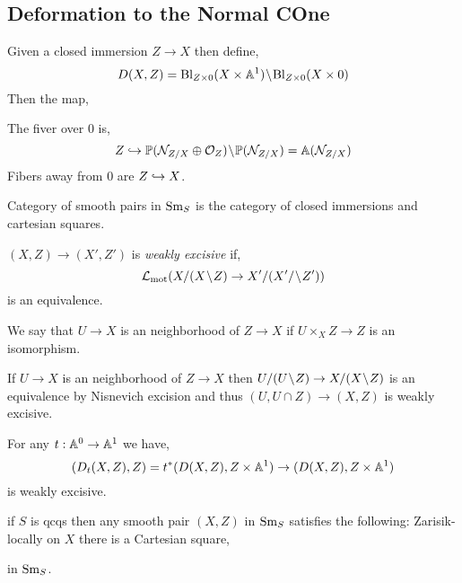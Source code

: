 \documentclass[12pt]{article}
\newcommand{\Bl}{\mathrm{Bl}}
\begin{document}
\subsection{Deformation to the Normal COne}

Given a closed immersion $Z \to X$ then define,
\[ D(X, Z) = \Bl_{Z \times 0} (X \times \A^1) \sm \Bl_{Z \times 0} (X \times 0) \]
Then the map,
\begin{center}
\end{center}
The fiver over $0$ is,
\[ Z \hookrightarrow \mathbb{P}(\mathcal{N}_{Z / X} \oplus \mathcal{O}_{Z}) \! \setminus \! \mathbb{P}(\mathcal{N}_{Z/X}) = \mathbb{A}(\mathcal{N}_{Z/X}) \]
Fibers away from $0$ are $Z \hookrightarrow X$. 

\begin{defn}
Category of smooth pairs in $\mathrm{Sm}_S$ is the category of closed immersions and cartesian squares.
\end{defn}

\begin{defn}
$(X, Z) \to (X', Z')$ is \textit{weakly excisive} if,
\[ \mathcal{L}_{\text{mot}} (X / (X \! \setminus \! Z) \to X'/(X'/\! \setminus \! Z')) \]
is an equivalence. 
\end{defn}

\begin{defn}
We say that $U \to X$ is an \etale neighborhood of $Z \to X$ if $U \times_X Z \to Z$ is an isomorphism. 
\end{defn}

\begin{rmk}
If $U \to X$ is an \etale neighborhood of $Z \to X$ then $U / (U \! \setminus \! Z) \to X / (X \! \setminus \! Z)$ is an equivalence by Nisnevich excision and thus $(U, U \cap Z) \to (X, Z)$ is weakly excisive. 
\end{rmk}


\begin{prop}
For any $t : \mathbb{A}^0 \to \mathbb{A}^1$ we have,
\[ (D_t(X, Z), Z) = t^* (D(X, Z), Z \times \mathbb{A}^1) \to (D(X, Z), Z \times \mathbb{A}^1) \]
is weakly excisive. 
\end{prop}

\begin{rmk}
if $S$ is qcqs then any smooth pair $(X, Z)$ in $\mathrm{Sm}_S$ satisfies the following: Zarisik-locally on $X$ there is a Cartesian square,
\begin{center}
\end{center}
in $\mathrm{Sm}_S$. 
\end{rmk}
\end{document}
